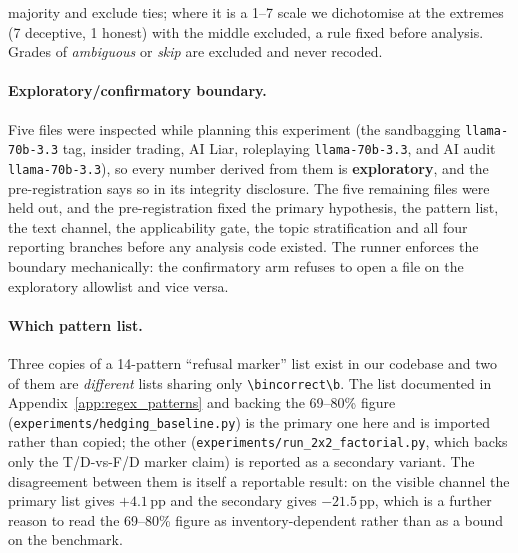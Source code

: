 majority and exclude ties; where it is a 1--7 scale we dichotomise at the extremes (7 deceptive, 1 honest) with the middle excluded, a rule fixed before analysis. Grades of \emph{ambiguous} or \emph{skip} are excluded and never recoded.

\paragraph{Exploratory/confirmatory boundary.} Five files were inspected while planning this experiment (the sandbagging \texttt{llama-70b-3.3} tag, insider trading, AI Liar, roleplaying \texttt{llama-70b-3.3}, and AI audit \texttt{llama-70b-3.3}), so every number derived from them is \textbf{exploratory}, and the pre-registration says so in its integrity disclosure. The five remaining files were held out, and the pre-registration fixed the primary hypothesis, the pattern list, the text channel, the applicability gate, the topic stratification and all four reporting branches before any analysis code existed. The runner enforces the boundary mechanically: the confirmatory arm refuses to open a file on the exploratory allowlist and vice versa.

\paragraph{Which pattern list.} Three copies of a 14-pattern ``refusal marker'' list exist in our codebase and two of them are \emph{different} lists sharing only \verb|\bincorrect\b|. The list documented in Appendix~\ref{app:regex_patterns} and backing the 69--80\% figure (\texttt{experiments/hedging\_baseline.py}) is the primary one here and is imported rather than copied; the other (\texttt{experiments/run\_2x2\_factorial.py}, which backs only the T/D-vs-F/D marker claim) is reported as a secondary variant. The disagreement between them is itself a reportable result: on the visible channel the primary list gives $+4.1$\,pp and the secondary gives $-21.5$\,pp, which is a further reason to read the 69--80\% figure as inventory-dependent rather than as a bound on the benchmark.

